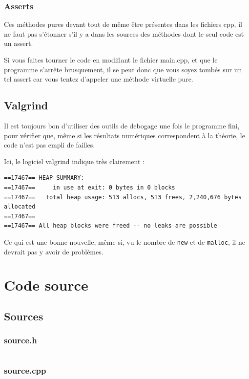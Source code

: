 \documentclass{report}
\begin{document}
\subsection{Asserts}
Ces méthodes pures devant tout de même être présentes dans les fichiers cpp, il ne faut pas s’étonner s’il y a dans
les sources des méthodes dont le seul code est un assert.

Si vous faites tourner le code en modifiant le fichier main.cpp, et que le programme s’arrête brusquement,
il se peut donc que vous soyez tombés sur un tel assert car vous tentez d’appeler une méthode virtuelle pure.

\section{Valgrind}
Il est toujours bon d’utiliser des outils de debogage une fois le programme fini, pour vérifier que, même si
les résultats numériques correspondent à la théorie, le code n’est pas empli de failles.

Ici, le logiciel valgrind indique très clairement :
\begin{verbatim}
==17467== HEAP SUMMARY:
==17467==     in use at exit: 0 bytes in 0 blocks
==17467==   total heap usage: 513 allocs, 513 frees, 2,240,676 bytes allocated
==17467==
==17467== All heap blocks were freed -- no leaks are possible
\end{verbatim}

Ce qui est une bonne nouvelle, même si, vu le nombre de \verb|new| et de \verb|malloc|, il ne devrait
pas y avoir de problèmes.



\appendix
{}
\chapter{Code source}
\section{Sources}
\subsection{source.h}
\inputminted[linenos,fontsize=\scriptsize]{c++}{../src/source.h}
\subsection{source.cpp}
\inputminted[linenos,fontsize=\scriptsize]{c++}{../src/source.cpp}
\end{document}
